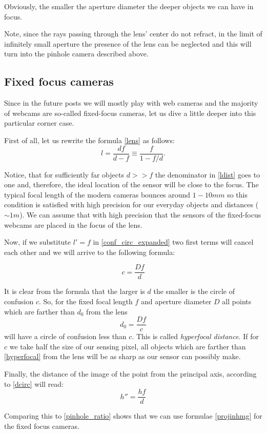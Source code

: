 \documentclass[a4paper,10pt]{article}
\begin{document}
Obviously, the smaller the aperture diameter the deeper objects we can have in focus. 

Note, since the rays passing through the lens' center do not refract, in the limit of infinitely small aperture the presence of the lens can be neglected and this will turn into the pinhole camera described above. 

\subsection{Fixed focus cameras}

Since in the future posts we will mostly play with web cameras and the majority of webcams are so-called fixed-focus cameras, let us dive a little deeper into this particular corner case.

First of all, let us rewrite the formula \eqref{lens} as follows:
\begin{equation}
l=\frac{df}{d-f}\equiv\frac{f}{1 - f/d}.\label{ldist}
\end{equation}

Notice, that for sufficiently far objects $d >> f$ the denominator in \eqref{ldist} goes to one and, therefore, the ideal location of the sensor will be close to the focus. The typical focal length of the modern cameras bounces around $1-10 mm$ so this condition is satisfied with high precision for our everyday objects and distances ($\sim 1m$). We can assume that with high precision that the sensors of the fixed-focus webcams are placed in the focus of the lens. 

Now, if we substitute $l'=f$ in \eqref{conf_circ_expanded} two first terms will cancel each other and we will arrive to the following formula:

\begin{equation}
c=\frac{Df}{d}
\end{equation}

It is clear from the formula that the larger is $d$ the smaller is the circle of confusion $c$. So, for the fixed focal length $f$ and aperture diameter $D$ all points which are farther than $d_0$ from the lens
\begin{equation}
d_0 = \frac{Df}{c} \label{hyperfocal}
\end{equation}
will have a circle of confusion less than $c$. This is called {\it hyperfocal distance}. If for $c$ we take half the  size of our sensing pixel, all objects which are farther than \eqref{hyperfocal} from the lens will be as sharp as our sensor can possibly make. 

Finally, the distance of the image of the point from the principal axis, according to \eqref{dcirc} will read:
\begin{equation}
h'' = \frac{hf}{d}
\end{equation}

Comparing this to \eqref{pinhole_ratio} shows that we can use formulae  \eqref{projinhmg} for the fixed focus cameras.
\end{document}
